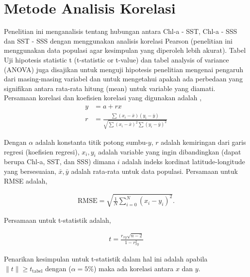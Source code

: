 \section[Metode Analisis Korelasi]{Metode Analisis Korelasi}
\begin{spacing}{1.5}
	Penelitian ini menganalisis tentang hubungan antara Chl-a - SST, Chl-a - SSS dan SST - SSS dengan menggunakan analisis korelasi Pearson (penelitian ini menggunakan data populasi agar kesimpulan yang diperoleh lebih akurat). Tabel Uji hipotesis statistic t (t-statistic or t-value) dan tabel analysis of variance (ANOVA) juga disajikan untuk menguji hipotesis penelitian mengenai pengaruh dari masing-masing variabel dan untuk mengetahui apakah ada perbedaan yang signifikan antara rata-rata hitung (mean) untuk variable yang diamati. Persamaan korelasi dan koefisien korelasi yang digunakan adalah ,
	\begin{equation}
		\begin{aligned}
			y &= a+rx\\
			r &= \frac{\sum (x_i - \bar{x})(y_i - \bar{y})}{\sqrt{\sum (x_i-\bar{x})^2\sum (y_i-\bar{y})^2}}
		\end{aligned}
	\end{equation}

	Dengan $\alpha$ adalah konstanta titik potong sumbu-$y$, $r$ adalah kemiringan dari garis regresi (koefisien regresi), $x_i, y_i$ adalah variable yang ingin dibandingkan (dapat berupa Chl-a, SST, dan SSS) dimana $i$ adalah indeks kordinat latitude-longitude yang bersesuaian, $\bar{x},\bar{y}$ adalah rata-rata untuk data populasi. Persamaan untuk RMSE adalah,
	
	\begin{equation}
		\begin{aligned}
			\text{RMSE}=\sqrt{\frac{1}{N}\sum_{i=0}^{N}(x_i-y_i)^2}.
		\end{aligned}
	\end{equation}
	
	Persamaan untuk t-statistik adalah,
	
	\begin{equation}
		\begin{aligned}
			t=\frac{r_{xy}\sqrt{n-2}}{1-r^2_{xy}}
		\end{aligned}
	\end{equation}
	
	Penarikan kesimpulan untuk t-statistik dalam hal ini adalah apabila $\|t\|\geq t_{\text{tabel}}$ dengan ($\alpha=5\%$) maka ada korelasi antara $x$ dan $y$.
\end{spacing}
\vspace{-0.5pc}

